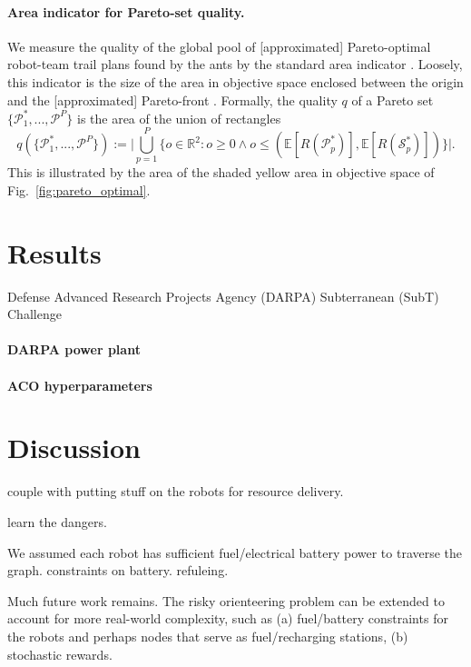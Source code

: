 \documentclass[11pt, oneside]{article}
\begin{document}
\paragraph{Area indicator for Pareto-set quality.}
We measure the quality of the global pool of [approximated] Pareto-optimal robot-team trail plans found by the ants by the standard area indicator \cite{cao2015using,guerreiro2020hypervolume}. Loosely, this indicator is the size of the area in objective space enclosed between the origin and the [approximated] Pareto-front . Formally, the quality $q$ of a Pareto set $\{\mathcal{P}^*_1, ...,\mathcal{P}^P\}$ is the area of the union of rectangles
\begin{equation}
	q(\{\mathcal{P}^*_1, ...,\mathcal{P}^P\}):=
	\Big \lvert 
		\bigcup_{p=1}^P \{ o \in \mathbb{R}^2 : o \geq 0 \wedge  o \leq (\mathbb{E}[R(\mathcal{P}^*_p)], \mathbb{E}[R(\mathcal{S}^*_p)]) \} 
	\Big \rvert.
\end{equation}
This is illustrated by the area of the shaded yellow area in objective space of Fig.~\ref{fig:pareto_optimal}.

\section{Results}

Defense Advanced Research Projects Agency (DARPA) Subterranean (SubT) Challenge \cite{chung2023into}

\paragraph{DARPA power plant}

\paragraph{ACO hyperparameters}



\section{Discussion}

couple with putting stuff on the robots for resource delivery.

learn the dangers.

We assumed each robot has sufficient fuel/electrical battery power to traverse the graph.
constraints on battery. refuleing.

Much future work remains.
The risky orienteering problem can be extended to account for more real-world complexity, such as (a) fuel/battery constraints for the robots and perhaps nodes that serve as fuel/recharging stations, (b) stochastic rewards.
\end{document}
